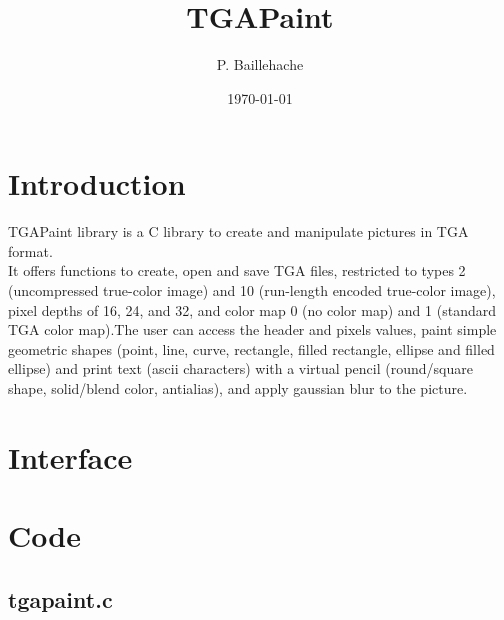 \documentclass[12pt, a4paper]{article}
\begin{document}
\title{TGAPaint}
\author{P. Baillehache}
\date{\today}
\maketitle

\tableofcontents

\section*{Introduction}

TGAPaint library is a C library to create and manipulate pictures in TGA format.\\

It offers functions to create, open and save TGA files, restricted to types 2 (uncompressed true-color image) and 10 (run-length encoded true-color image), pixel depths of 16, 24, and 32, and color map 0 (no color map) and 1 (standard TGA color map).The user can access the header and pixels values, paint simple geometric shapes (point, line, curve, rectangle, filled rectangle, ellipse and filled ellipse) and print text (ascii characters) with a virtual pencil (round/square shape, solid/blend color, antialias), and apply gaussian blur to the picture.\\ 

\section{Interface}

\begin{scriptsize}
\begin{ttfamily}

\end{ttfamily}
\end{scriptsize}

\section{Code}

\subsection{tgapaint.c}

\begin{scriptsize}
\begin{ttfamily}

\end{ttfamily}
\end{scriptsize}
\end{document}
